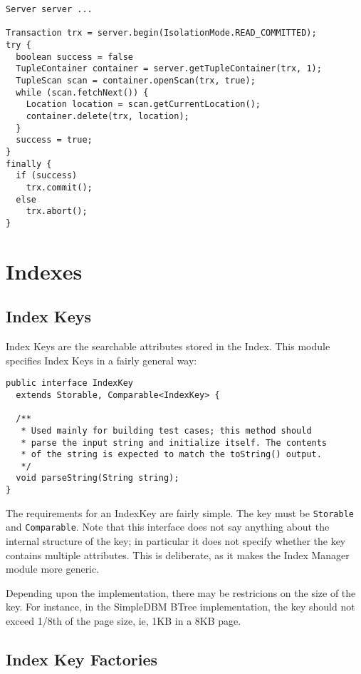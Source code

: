 \documentclass[a4paper,draft,oneside]{book}
\begin{document}
\begin{verbatim}
Server server ...

Transaction trx = server.begin(IsolationMode.READ_COMMITTED);
try {
  boolean success = false      
  TupleContainer container = server.getTupleContainer(trx, 1);
  TupleScan scan = container.openScan(trx, true);
  while (scan.fetchNext()) {
    Location location = scan.getCurrentLocation();
    container.delete(trx, location);
  }
  success = true;
}
finally {
  if (success)
    trx.commit();
  else
    trx.abort();
}
\end{verbatim}

\chapter{Indexes}

\section{Index Keys}

Index Keys are the searchable attributes stored in the Index. This module
specifies Index Keys in a fairly general way:

\begin{verbatim}
public interface IndexKey 
  extends Storable, Comparable<IndexKey> {
	
  /**
   * Used mainly for building test cases; this method should
   * parse the input string and initialize itself. The contents 
   * of the string is expected to match the toString() output.
   */
  void parseString(String string);
}
\end{verbatim}

The requirements for an IndexKey are fairly simple. The key must be
\verb|Storable| and \verb|Comparable|. Note that this interface does
not say anything about the internal structure of the key; in
particular it does not specify whether the key contains multiple
attributes. This is deliberate, as it makes the Index Manager module
more generic.

Depending upon the implementation, there may be restricions on the
size of the key. For instance, in the SimpleDBM BTree implementation,
the key should not exceed 1/8th of the page size, ie, 1KB in a 8KB
page.

\section{Index Key Factories}
\end{document}
